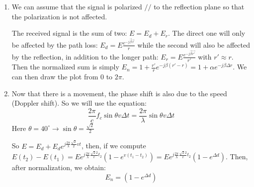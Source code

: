 
\begin{solution}
	\begin{enumerate}
	\item
		We can assume that the signal is polarized $//$ to the reflection plane so that the polarization is not affected.
		
		
		The received signal is the sum of two: $E = E_d + E_r$. The direct one will only be affected by the path loss:  $E_d = E\frac{e^{-j\vec{\beta} \vec{r}}}{r}$ while the second will also be affected by the reflection, in addition to the longer path:
		$E_r = E\frac{e^{-j\vec{\beta} \vec{r'}}}{r'}$ with $r' \approx r$.
		Then the normalized sum is simply $E_n = 1 + \frac{r'}{r}e^{-j\beta(r' - r)} =  1 + \alpha e^{-j\beta\Delta r}$. We can then draw the plot from $0$ to $2\pi$.
		
		
	\item Now that there is a movement, the phase shift is also due to the speed (Doppler shift). So we will use the equation:
	$$ \frac{2\pi}{c}f_c \sin \theta v \Delta t = \frac{2\pi}{\lambda} \sin \theta v \Delta t$$
	Here $\theta = 40^\circ \rightarrow \sin \theta = \frac{\sqrt{2}}{2}$
	
	So $E = E_d + E_d e^{j\frac{2\pi}{\lambda}\frac{\sqrt{2}}{2}v t}$, then, if we compute $E(t_2) - E(t_1) = E e^{j \frac{2\pi}{\lambda} \frac{\sqrt{2}{2}}v t_2} (1 - e^{v (t_1 - t_2)}) = E e^{j \frac{2\pi}{\lambda} \frac{\sqrt{2}{2}}v t_2}(1 - e^{\Delta d})$.
	Then, after normalization, we obtain:
	$$E_n = (1 - e^{\Delta d})$$
	
	\end{enumerate} 
\end{solution}

\nosolution
